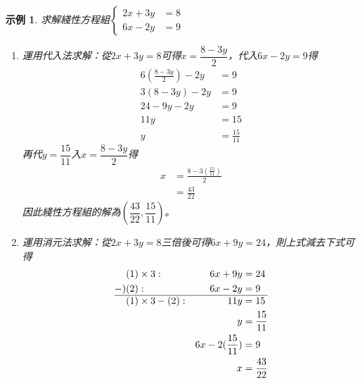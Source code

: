 \documentclass[12pt]{article}
\newtheorem*{example}{示例}
\begin{document}
    \begin{example}
        求解綫性方程組$\begin{cases}
            2x+3y&=8\\
            6x-2y&=9
        \end{cases}$
        \begin{enumerate}
            \item 運用代入法求解：從$2x+3y=8$可得$x=\dfrac{8-3y}{2}$，代入$6x-2y=9$得\begin{align*}
                6(\frac{8-3y}{2})-2y&=9\\
                3(8-3y)-2y&=9\\
                24-9y-2y&=9\\
                11y&=15\\
                y&=\frac{15}{11}
            \end{align*}
            再代$y=\dfrac{15}{11}$入$x=\dfrac{8-3y}{2}$得\begin{align*}
                x&=\frac{8-3(\frac{15}{11})}{2}\\
                &=\frac{43}{22}
            \end{align*}
            因此綫性方程組的解為$(\dfrac{43}{22},\dfrac{15}{11})$。
            \item 運用消元法求解：從$2x+3y=8$三倍後可得$6x+9y=24$，則上式減去下式可得\begin{align*}
                &(1)\times 3:&6x+9y&=24\\
                -)&(2):&6x-2y&=9\\
                \hline
                &(1)\times 3 - (2):&11y&=15\\
                &&y&=\frac{15}{11}\\
                &&6x-2(\frac{15}{11})&=9\\
                &&x&=\frac{43}{22}
            \end{align*}
        \end{enumerate}
    \end{example}
\end{document}
